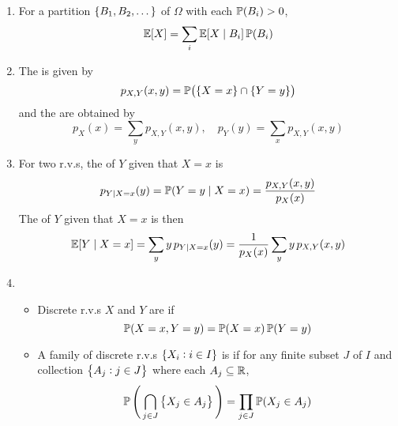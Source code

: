 \documentclass{styles/note}
\begin{document}
\begin{enumerate}[label=(\alph*)]
    \item {}
      For a partition $\set{B_1, B_2, \dots}$ of $\Omega$ with each $\operatorname{\mathbb{P}}(B_i) > 0$,
      \begin{equation}
        \operatorname{\mathbb{E}}[X] = \sum_i \operatorname{\mathbb{E}}[X \mid B_i] \operatorname{\mathbb{P}}(B_i)
      \end{equation}
    
    \item The  is given by
      \[ p_{X, Y}(x, y) = \prob\left(\set{X = x} \cap \set{Y = y}\right) \]
      and the  are obtained by
      \begin{equation}
        p_X(x) = \sum_y p_{X, Y}(x, y), \quad p_Y(y) = \sum_x p_{X, Y}(x, y)
      \end{equation}
    
    \item For two r.v.s, the  of $Y$ given that $X = x$ is
      \begin{equation}
        p_{Y \mid X=x}(y) = \operatorname{\mathbb{P}}(Y = y \mid X = x) = \frac{p_{X, Y}(x, y)}{p_X(x)}
      \end{equation}
      The  of $Y$ given that $X = x$ is then
      \begin{equation}
        \operatorname{\mathbb{E}}[Y \mid X = x] = \sum_y y\, p_{Y \mid X=x}(y) = \frac{1}{p_X(x)} \sum_y y\,p_{X, Y}(x, y)
      \end{equation}
    
    \item
      \begin{itemize}[leftmargin=1em]
        \item Discrete r.v.s $X$ and $Y$ are  if
          \begin{equation}
            \operatorname{\mathbb{P}}(X = x, Y = y) = \operatorname{\mathbb{P}}(X = x) \operatorname{\mathbb{P}}(Y = y)
          \end{equation}
        \item A family of discrete r.v.s $\set{X_i : i \in I}$ is  if for any finite subset $J$ of $I$ and collection $\set{A_j : j \in J}$ where each $A_j \subseteq \mathbb{R}$,
          \begin{equation}
            \operatorname{\mathbb{P}}\Bigg(\bigcap_{j \in J} \set{X_j \in A_j}\Bigg) = \prod_{j \in J} \operatorname{\mathbb{P}}(X_j \in A_j)
          \end{equation}
      \end{itemize}
    

\end{enumerate}
\end{document}
